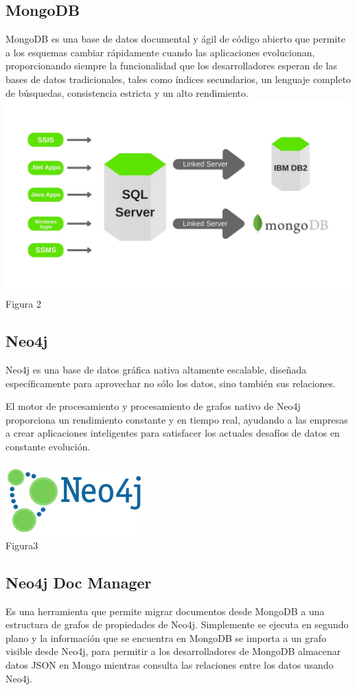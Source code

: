 \documentclass[conference]{IEEEtran}
\begin{document}
\subsection{MongoDB}
MongoDB es una base de datos documental y \'agil de c\'odigo abierto que permite a los esquemas cambiar r\'apidamente cuando las aplicaciones evolucionan, proporcionando siempre la funcionalidad que los desarrolladores esperan de las bases de datos tradicionales, tales como \'indices secundarios, un lenguaje completo de b\'usquedas, consistencia estricta y un alto rendimiento.\cite{mongo}
\\
\centering
\includegraphics[scale=0.1]{Imagenes/mongodbsql.jpg}
\\Figura 2
\subsection{Neo4j}
Neo4j es una base de datos gr\'afica nativa altamente escalable, diseñada espec\'ificamente para aprovechar no s\'olo los datos, sino tambi\'en sus relaciones.

El motor de procesamiento y procesamiento de grafos nativo de Neo4j proporciona un rendimiento constante y en tiempo real, ayudando a las empresas a crear aplicaciones inteligentes para satisfacer los actuales desafíos de datos en constante evolución.\cite{neo}
\\\\
\centering
\includegraphics[scale=1]{Imagenes/neo4j.png}\\Figura3
\subsection{Neo4j Doc Manager}
Es una herramienta que permite migrar documentos desde MongoDB a una estructura de grafos de propiedades de Neo4j. Simplemente se ejecuta en segundo plano y la informaci\'on que se encuentra en MongoDB se importa a un grafo visible desde Neo4j, para permitir a los desarrolladores de MongoDB almacenar datos JSON en Mongo mientras consulta las relaciones entre los datos usando Neo4j.
\end{document}
